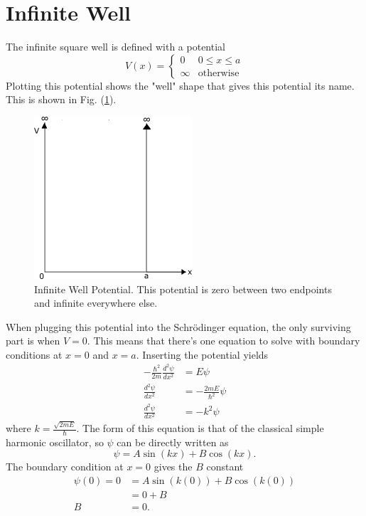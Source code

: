 \section{Infinite Well}
The infinite square well is defined with a potential 
\begin{equation}
    V(x)=\begin{cases} 0 & 0\leq x \leq a\\
                       \infty & \text{otherwise}
        \end{cases}
\end{equation}
Plotting this potential shows the "well" shape that gives this potential its name. This is shown in Fig. (\ref{fig: Infinite Well Potential}).
\begin{figure}[H]
    \centering
    \includegraphics[scale=0.75]{figures/pdf/sqwellpot.png}
    \caption{Infinite Well Potential. This potential is zero between two endpoints and infinite everywhere else.}
    \label{fig: Infinite Well Potential}
\end{figure}
When plugging this potential into the Schr\"odinger equation, the only surviving part is when $V=0$. This means that there's one equation to solve with boundary conditions at $x=0$ and $x=a$. Inserting the potential yields
\begin{align}
    -\frac{\hbar^2}{2m}\frac{d^2\psi}{dx^2}&=E\psi\nonumber\\
    \frac{d^2\psi}{dx^2}&=-\frac{2mE}{\hbar^2}\psi\nonumber\\
    \frac{d^2\psi}{dx^2}&=-k^2\psi
\end{align}
where $k=\frac{\sqrt{2mE}}{\hbar}$. The form of this equation is that of the classical simple harmonic oscillator, so $\psi$ can be directly written as 
\begin{equation}
    \psi=A\sin(kx)+B\cos(kx).
\end{equation}
The boundary condition at $x=0$ gives the $B$ constant 
\begin{align}
    \psi(0)=0&=A\sin(k(0))+B\cos(k(0))\\
    &=0+B\\
    B&=0.
\end{align}
